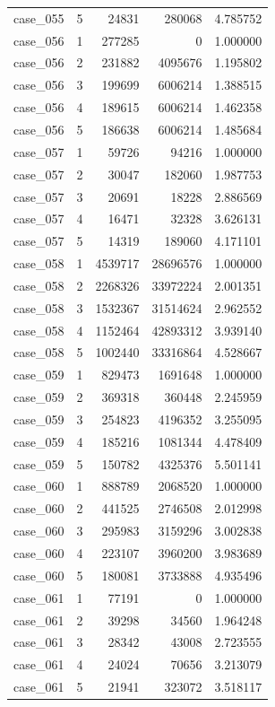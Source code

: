 \begin{longtable}{lrrrr}
case\_055 & 5 & 24831 & 280068 & 4.785752 \\
case\_056 & 1 & 277285 & 0 & 1.000000 \\
case\_056 & 2 & 231882 & 4095676 & 1.195802 \\
case\_056 & 3 & 199699 & 6006214 & 1.388515 \\
case\_056 & 4 & 189615 & 6006214 & 1.462358 \\
case\_056 & 5 & 186638 & 6006214 & 1.485684 \\
case\_057 & 1 & 59726 & 94216 & 1.000000 \\
case\_057 & 2 & 30047 & 182060 & 1.987753 \\
case\_057 & 3 & 20691 & 18228 & 2.886569 \\
case\_057 & 4 & 16471 & 32328 & 3.626131 \\
case\_057 & 5 & 14319 & 189060 & 4.171101 \\
case\_058 & 1 & 4539717 & 28696576 & 1.000000 \\
case\_058 & 2 & 2268326 & 33972224 & 2.001351 \\
case\_058 & 3 & 1532367 & 31514624 & 2.962552 \\
case\_058 & 4 & 1152464 & 42893312 & 3.939140 \\
case\_058 & 5 & 1002440 & 33316864 & 4.528667 \\
case\_059 & 1 & 829473 & 1691648 & 1.000000 \\
case\_059 & 2 & 369318 & 360448 & 2.245959 \\
case\_059 & 3 & 254823 & 4196352 & 3.255095 \\
case\_059 & 4 & 185216 & 1081344 & 4.478409 \\
case\_059 & 5 & 150782 & 4325376 & 5.501141 \\
case\_060 & 1 & 888789 & 2068520 & 1.000000 \\
case\_060 & 2 & 441525 & 2746508 & 2.012998 \\
case\_060 & 3 & 295983 & 3159296 & 3.002838 \\
case\_060 & 4 & 223107 & 3960200 & 3.983689 \\
case\_060 & 5 & 180081 & 3733888 & 4.935496 \\
case\_061 & 1 & 77191 & 0 & 1.000000 \\
case\_061 & 2 & 39298 & 34560 & 1.964248 \\
case\_061 & 3 & 28342 & 43008 & 2.723555 \\
case\_061 & 4 & 24024 & 70656 & 3.213079 \\
case\_061 & 5 & 21941 & 323072 & 3.518117 \\

\end{longtable}
